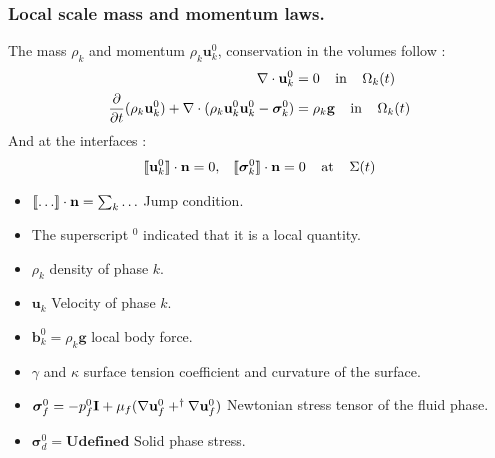 \documentclass{sintefbeamer}
\begin{document}
\begin{frame}
  \frametitle{Local scale mass and momentum laws.}
  The mass $\rho_k$ and momentum $\rho_k \textbf{u}_k^0$, conservation in the volumes follow :
\begin{align}
  \mathbf{\nabla}\cdot  \textbf{u}_k^0
  &= 
  0
  \;\;\;\; 
  \text{in} 
  \;\;\;\; 
  \Omega_k(t)\\
  \frac{\partial}{\partial t} (\rho_k \textbf{u}_k^0)  
  + \mathbf{\nabla}\cdot (
      \rho_k \textbf{u}_k^0\textbf{u}_k^0
      - \bm{\sigma}_k^0 
      )
  &= 
  \rho_k \textbf{g}
  \;\;\;\; 
  \text{in} 
  \;\;\;\; 
  \Omega_k(t)
\end{align}
And at the interfaces : 
\begin{align*}
  \llbracket \textbf{u}_k^0 \rrbracket \cdot \textbf{n}
  = 0,\;\;\;
  \llbracket \bm{\sigma}_k^0 \rrbracket \cdot \textbf{n}
  = 
  0
   \;\;\;\; 
   \text{at} 
   \;\;\;\; 
   \Sigma(t)
\end{align*}
\begin{definition}
  \begin{itemize}
    \item $\llbracket \ldots \rrbracket \cdot \textbf{n} = \sum_k \ldots$ Jump condition.  
    \item The superscript $^0$ indicated that it is a local quantity.
    \item $\rho_k$  density of phase $k$. 
    \item $\textbf{u}_k$  Velocity of phase $k$.
    \item $\textbf{b}_k^0 = \rho_k \textbf{g}$  local body force.  
    \item $\gamma$ and $\kappa$  surface tension coefficient and curvature of the surface.  
    \item $\bm\sigma_f^0 = -p_f^0 \textbf{I} + \mu_f (\mathbf{\nabla} \textbf{u}_f^0+^\dagger\mathbf{\nabla} \textbf{u}_f^0)$ Newtonian stress tensor of the fluid phase. 
    \item $\bm\sigma_d^0 = \textbf{Udefined}$ Solid phase stress. 
  \end{itemize}
\end{definition}

\end{frame}


  
\end{document}
